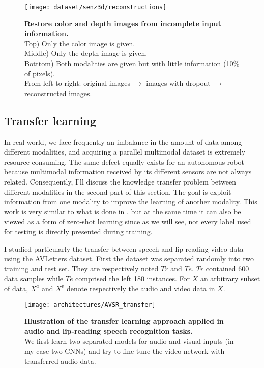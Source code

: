 \begin{figure}[H]
  \centering
  \texttt{[image: dataset/senz3d/reconstructions]}
  \caption{%
    \textbf{Restore color and depth images from incomplete input
      information.}\\[0.1em]
    Top) Only the color image is given.\\[0.1em]
    Middle) Only the depth image is given.\\[0.1em]
    Botttom) Both modalities are given but with little information
      (10\% of pixels).\\[0.1em]
    From left to right: original images $\rightarrow$ images with
      dropout $\rightarrow$ reconstructed images.
    }
  \label{fig:color_depth_restoration}
\end{figure}

\subsection{Transfer learning} \label{subsection:AVSR_transfer}

In real world, we face frequently an imbalance in the amount of data
among different modalities, and acquiring a parallel multimodal
dataset is extremely resource consuming.
The same defect equally exists for an autonomous robot because
multimodal information received by its different sensors are not always
related.
Consequently, I'll discuss the knowledge transfer problem between
different modalities in the second part of this section.
The goal is exploit information from one modality to improve the
learning of another modality.
This work is very similar to what is done in \cite{S. Moon 2015},
but at the same time it can also be viewed as a form of zero-shot
learning \cite{A. Frome 2013, R. Socher 2013} since as we will see,
not every label used for testing is directly presented during training.

I studied particularly the transfer between speech and lip-reading
video data using the AVLetters dataset. First the dataset was separated
randomly into two training and test set.
They are respectively noted $Tr$ and $Te$.
$Tr$ contained 600 data samples while $Te$ comprised the left 180 instances.
For $X$ an arbitrary subset of data, $X^a$ and $X^v$ denote respectively
the audio and video data in $X$.

\begin{figure}[!b]
  \centering
  \texttt{[image: architectures/AVSR\_transfer]}
  \caption{%
    \textbf{Illustration of the transfer learning approach applied in
      audio and lip-reading speech recognition tasks.}\\[0.1em]
    We first learn two separated models for audio and visual inputs
      (in my case two CNNs) and try to fine-tune the video network
      with transferred audio data.
    }
  \label{fig:AVSR_transfer}
\end{figure}

